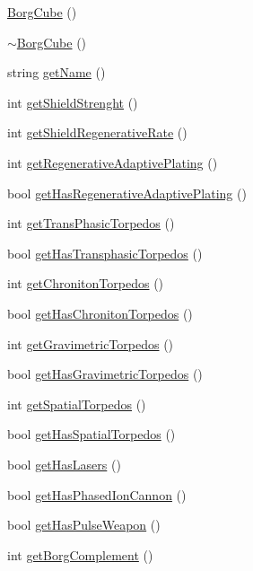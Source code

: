 \begin{DoxyCompactItemize}
\item 
\hyperlink{classBorgCube_a55a4e4bb838f002a5d83e99519ad22df}{BorgCube} ()
\item 
\hyperlink{classBorgCube_ac714320be9e02beb96853f7143a71486}{$\sim$BorgCube} ()
\item 
string \hyperlink{classBorgCube_a55fa0b12833f3df64b8157c2c05a2bfe}{getName} ()
\item 
int \hyperlink{classBorgCube_a7a6144a9e194eaccdf5d24965b12903c}{getShieldStrenght} ()
\item 
int \hyperlink{classBorgCube_a81acc970f271200df76d98f963c2de75}{getShieldRegenerativeRate} ()
\item 
int \hyperlink{classBorgCube_ab69b67f5b39c837efedad33fb7d21c73}{getRegenerativeAdaptivePlating} ()
\item 
bool \hyperlink{classBorgCube_abd8457ff37b980ca21e58dee957046cb}{getHasRegenerativeAdaptivePlating} ()
\item 
int \hyperlink{classBorgCube_a07417d4ed25e0d0efce29f3b5796dbc3}{getTransPhasicTorpedos} ()
\item 
bool \hyperlink{classBorgCube_a043284f5d42efc224320284a74270836}{getHasTransphasicTorpedos} ()
\item 
int \hyperlink{classBorgCube_a46efbcd3dfc7483c0373bf23d94179ba}{getChronitonTorpedos} ()
\item 
bool \hyperlink{classBorgCube_aea74a439176f217e25c9fb37015b9088}{getHasChronitonTorpedos} ()
\item 
int \hyperlink{classBorgCube_adf64a078b71330e27fe3074c5a278428}{getGravimetricTorpedos} ()
\item 
bool \hyperlink{classBorgCube_abb0288f7ec08d8acb2aa0f3be2e4ada4}{getHasGravimetricTorpedos} ()
\item 
int \hyperlink{classBorgCube_aad53d42f485e62d282e3607ce7c33007}{getSpatialTorpedos} ()
\item 
bool \hyperlink{classBorgCube_afdc5573e2b59fd647f4b2ddb67913c43}{getHasSpatialTorpedos} ()
\item 
bool \hyperlink{classBorgCube_a780ad07deecda3bb7a97ed62365b926f}{getHasLasers} ()
\item 
bool \hyperlink{classBorgCube_af7010edc4afc7ab22fe8bc8294156478}{getHasPhasedIonCannon} ()
\item 
bool \hyperlink{classBorgCube_aff18909b84ec3efb8aa26b6a3aa6cba0}{getHasPulseWeapon} ()
\item 
int \hyperlink{classBorgCube_a971df059540d40c2fbf69116c6ea991f}{getBorgComplement} ()

\end{DoxyCompactItemize}
